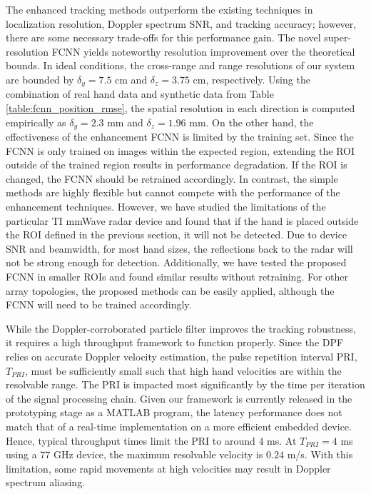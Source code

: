 \documentclass[10pt,journal,final]{IEEEtran}
\begin{document}
The enhanced tracking methods outperform the existing techniques in localization resolution, Doppler spectrum SNR, and tracking accuracy; however, there are some necessary trade-offs for this performance gain. 
The novel super-resolution FCNN yields noteworthy resolution improvement over the theoretical bounds.
In ideal conditions, the cross-range and range resolutions of our system are bounded by $\delta_y = 7.5$ cm and $\delta_z = 3.75$ cm, respectively.
Using the combination of real hand data and synthetic data from Table \ref{table:fcnn_position_rmse}, the spatial resolution in each direction is computed empirically as $\delta_y = 2.3$ mm and $\delta_z = 1.96$ mm. 
On the other hand, the effectiveness of the enhancement FCNN is limited by the training set. 
Since the FCNN is only trained on images within the expected region, extending the ROI outside of the trained region results in performance degradation. 
If the ROI is changed, the FCNN should be retrained accordingly.
In contrast, the simple methods are highly flexible but cannot compete with the performance of the enhancement techniques.
However, we have studied the limitations of the particular TI mmWave radar device and found that if the hand is placed outside the ROI defined in the previous section, it will not be detected.
Due to device SNR and beamwidth, for most hand sizes, the reflections back to the radar will not be strong enough for detection.
Additionally, we have tested the proposed FCNN in smaller ROIs and found similar results without retraining.
For other array topologies, the proposed methods can be easily applied, although the FCNN will need to be trained accordingly.

While the Doppler-corroborated particle filter improves the tracking robustness, it requires a high throughput framework to function properly.
Since the DPF relies on accurate Doppler velocity estimation, the pulse repetition interval PRI, $T_{PRI}$, must be sufficiently small such that high hand velocities are within the resolvable range.
The PRI is impacted most significantly by the time per iteration of the signal processing chain.
Given our framework is currently released in the prototyping stage as a MATLAB program, the latency performance does not match that of a real-time implementation on a more efficient embedded device.
Hence, typical throughput times limit the PRI to around $4$ ms.
At $T_{PRI} = 4$ ms using a $77$ GHz device, the maximum resolvable velocity is $0.24$ m/s.
With this limitation, some rapid movements at high velocities may result in Doppler spectrum aliasing.
\end{document}
